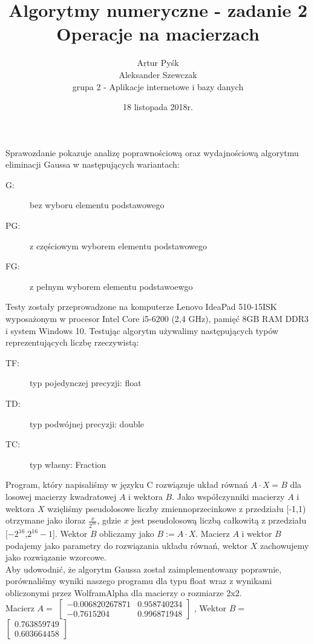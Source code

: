 \documentclass[11pt]{article}
\author{Artur Pyśk \\ Aleksander Szewczak \\ grupa 2 - Aplikacje internetowe i bazy danych}
\title{%
  Algorytmy numeryczne - zadanie 2 \\
  \large Operacje na macierzach}
\date{18 listopada 2018r.}
\begin{document}
 \maketitle
Sprawozdanie pokazuje analizę poprawnościową oraz wydajnościową algorytmu eliminacji Gaussa w następujących wariantach:
\begin{description}
  \item[G:] bez wyboru elementu podstawowego
  \item[PG:] z częściowym wyborem elementu podstawowego
  \item[FG:] z pełnym wyborem elementu podstawoewgo
\end{description}
Testy zostały przeprowadzone na komputerze Lenovo IdeaPad 510-15ISK wyposażonym w procesor Intel Core i5-6200 (2,4 GHz), pamięć 8GB RAM DDR3 i system Windows 10. Testując algorytm używalimy następujących typów reprezentujących liczbę rzeczywistą:
\begin{description}
  \item[TF:] typ pojedynczej precyzji: float
  \item[TD:] typ podwójnej precyzji: double
  \item[TC:] typ własny: Fraction
\end{description}
Program, który napisaliśmy w języku C rozwiązuje układ równań $A \cdot X = B$ dla losowej macierzy kwadratowej $A$ i wektora $B$. Jako współczynniki macierzy $A$ i wektora $X$ wzięliśmy pseudolosowe liczby zmiennoprzecinkowe z przedziału [-1,1) otrzymane jako iloraz $\frac{x}{2^{16}}$, gdzie $x$ jest pseudolosową liczbą całkowitą z przedziału [$-2^{16}$,$2^{16}-1$]. Wektor $B$ obliczamy jako $B:=A \cdot X$. Macierz $A$ i wektor $B$ podajemy jako parametry do rozwiązania układu równań, wektor $X$ zachowujemy jako rozwiązanie wzorcowe. 
\\[1\baselineskip]
Aby udowodnić, że algorytm Gaussa został zaimplementowany poprawnie, porównaliśmy wyniki naszego programu dla typu float wraz z wynikami obliczonymi przez WolframAlpha dla macierzy o rozmiarze 2x2.
\\[1\baselineskip]
Macierz $A = $
$\begin{bmatrix}
    -0.006820267871      & 0.958740234  \\
    -0.7615204       & 0.996871948
\end{bmatrix}$
, Wektor $B = $
$\begin{bmatrix}
   0.763859749  \\
   0.603664458
\end{bmatrix}$
\end{document}
